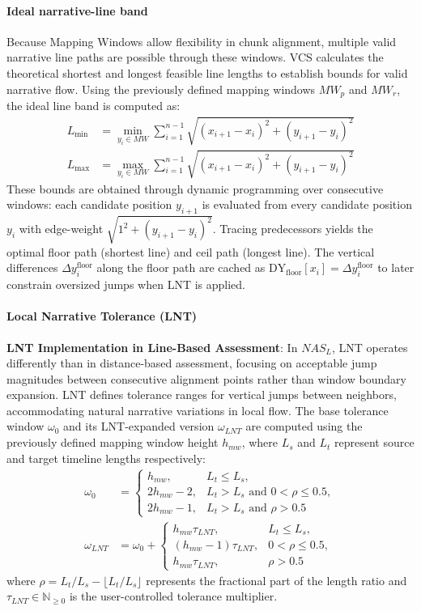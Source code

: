\documentclass[main.tex]{subfiles}
\begin{document}
\paragraph{Ideal narrative-line band}
Because Mapping Windows allow flexibility in chunk alignment, multiple valid narrative line paths are possible through these windows. VCS calculates the theoretical shortest and longest feasible line lengths to establish bounds for valid narrative flow. Using the previously defined mapping windows $MW_p$ and $MW_r$, the ideal line band is computed as:
\begin{align}
L_{\min} &= \min_{y_i \in MW} \sum_{i=1}^{n-1} \sqrt{(x_{i+1} - x_i)^2 + (y_{i+1} - y_i)^2} \\
L_{\max} &= \max_{y_i \in MW} \sum_{i=1}^{n-1} \sqrt{(x_{i+1} - x_i)^2 + (y_{i+1} - y_i)^2}
\end{align}
These bounds are obtained through dynamic programming over consecutive windows: each candidate position $y_{i+1}$ is evaluated from every candidate position $y_i$ with edge-weight $\sqrt{1^2 + (y_{i+1} - y_i)^2}$. Tracing predecessors yields the optimal floor path (shortest line) and ceil path (longest line). The vertical differences $\Delta y_i^{\text{floor}}$ along the floor path are cached as $\text{DY}_{\text{floor}}[x_i] = \Delta y_i^{\text{floor}}$ to later constrain oversized jumps when LNT is applied.

\paragraph{Local Narrative Tolerance (LNT)}

\textbf{LNT Implementation in Line-Based Assessment}: In $NAS_L$, LNT operates differently than in distance-based assessment, focusing on acceptable jump magnitudes between consecutive alignment points rather than window boundary expansion. LNT defines tolerance ranges for vertical jumps between neighbors, accommodating natural narrative variations in local flow. The base tolerance window $\omega_0$ and its LNT-expanded version $\omega_{LNT}$ are computed using the previously defined mapping window height $h_{mw}$, where $L_s$ and $L_t$ represent source and target timeline lengths respectively:
\begin{align}
\omega_0 &= \begin{cases}
h_{mw}, & L_t \leq L_s, \\
2h_{mw} - 2, & L_t > L_s \text{ and } 0 < \rho \leq 0.5, \\
2h_{mw} - 1, & L_t > L_s \text{ and } \rho > 0.5
\end{cases} \\
\omega_{LNT} &= \omega_0 + \begin{cases}
h_{mw} \tau_{LNT}, & L_t \leq L_s, \\
(h_{mw} - 1) \tau_{LNT}, & 0 < \rho \leq 0.5, \\
h_{mw} \tau_{LNT}, & \rho > 0.5
\end{cases}
\end{align}
where $\rho = L_t/L_s - \lfloor L_t/L_s \rfloor$ represents the fractional part of the length ratio and $\tau_{LNT} \in \mathbb{N}_{\geq 0}$ is the user-controlled tolerance multiplier.
\end{document}
